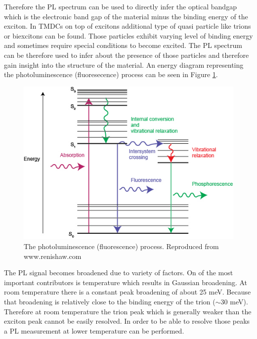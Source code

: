 Therefore the PL spectrum can be used to directly infer the optical bandgap which is the electronic band gap of the material minus the binding energy of the exciton. In TMDCs on top of excitons additional type of quasi particle like trions or biexcitons can be found. Those particles exhibit varying level of binding energy and sometimes require special conditions to become excited. The PL spectrum can be therefore used to infer about the presence of those particles and therefore gain insight into the structure of the material. An energy diagram representing the photoluminescence (fluoresecence) process can be seen in Figure \ref{fig:MethodologyPLDiagram}.

\begin{figure}[!h]
	\begin{center}
		\includegraphics[scale=0.7]{Methodology/PLDiagram.png}
		\caption{The photoluminescence (fluorescence) process. Reproduced from www.renishaw.com}
		\label{fig:MethodologyPLDiagram}
	\end{center}
\end{figure}

The PL signal becomes broadened due to variety of factors. On of the most important contributors is temperature which results in Gaussian broadening. At room temperature there is a constant peak broadening of about 25 meV. Because that broadening is relatively close to the binding energy of the trion ($\sim$30 meV). Therefore at room temperature the trion peak which is generally weaker than the exciton peak cannot be easily resolved. In order to be able to resolve those peaks a PL measurement at lower temperature can be performed.

